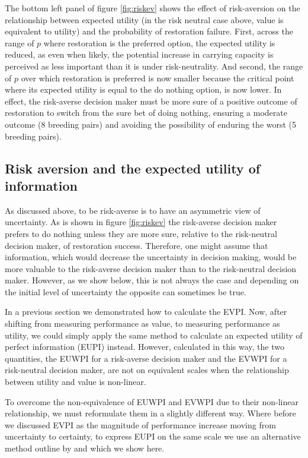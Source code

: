 \documentclass[]{article}
\theoremstyle{definition}
\theoremstyle{definition}
\theoremstyle{definition}
\theoremstyle{remark}
\begin{document}
The bottom left panel of figure \ref{fig:riskev} shows the effect of
risk-aversion on the relationship between expected utility (in the risk
neutral case above, value is equivalent to utility) and the probability
of restoration failure. First, across the range of \(p\) where
restoration is the preferred option, the expected utility is reduced, as
even when likely, the potential increase in carrying capacity is
perceived as less important than it is under risk-neutrality. And
second, the range of \(p\) over which restoration is preferred is now
smaller because the critical point where its expected utility is equal
to the do nothing option, is now lower. In effect, the risk-averse
decision maker must be more sure of a positive outcome of restoration to
switch from the sure bet of doing nothing, ensuring a moderate outcome
(8 breeding pairs) and avoiding the possibility of enduring the worst (5
breeding pairs).

\subsection*{Risk aversion and the expected utility of
information}\label{risk-aversion-and-the-expected-utility-of-information}

As discussed above, to be risk-averse is to have an asymmetric view of
uncertainty. As is shown in figure \ref{fig:riskev} the risk-averse
decision maker prefers to do nothing unless they are more sure, relative
to the risk-neutral decision maker, of restoration success. Therefore,
one might assume that information, which would decrease the uncertainty
in decision making, would be more valuable to the risk-averse decision
maker than to the risk-neutral decision maker. However, as we show
below, this is not always the case and depending on the initial level of
uncertainty the opposite can sometimes be true.

In a previous section we demonstrated how to calculate the EVPI. Now,
after shifting from measuring performance as value, to measuring
performance as utility, we could simply apply the same method to
calculate an expected utility of perfect information (EUPI) instead.
However, calculated in this way, the two quantities, the EUWPI for a
risk-averse decision maker and the EVWPI for a risk-neutral decision
maker, are not on equivalent scales when the relationship between
utility and value is non-linear.

To overcome the non-equivalence of EUWPI and EVWPI due to their
non-linear relationship, we must reformulate them in a slightly
different way. Where before we discussed EVPI as the magnitude of
performance increase moving from uncertainty to certainty, to express
EUPI on the same scale we use an alternative method outline by
\citet{Eeckhoudt2000} and which we show here.
\end{document}
